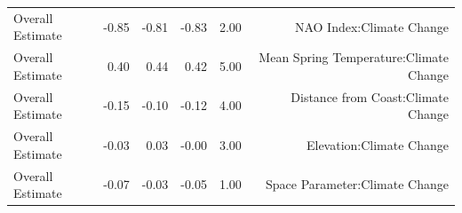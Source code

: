 \documentclass{article}\usepackage[]{graphicx}\usepackage[]{color}
\begin{document}
{\begin{table}[H]
\begin{tabular}{lrrrrr}
  Overall Estimate & -0.85 & -0.81 & -0.83 & 2.00 & NAO Index:Climate Change \\ 
  Overall Estimate & 0.40 & 0.44 & 0.42 & 5.00 & Mean Spring 
Temperature:Climate Change \\ 
  Overall Estimate & -0.15 & -0.10 & -0.12 & 4.00 & Distance from 
Coast:Climate Change \\ 
  Overall Estimate & -0.03 & 0.03 & -0.00 & 3.00 & Elevation:Climate Change \\ 
  Overall Estimate & -0.07 & -0.03 & -0.05 & 1.00 & Space Parameter:Climate Change \\ 
   \hline
\end{tabular}
\end{table}

}
\end{document}
